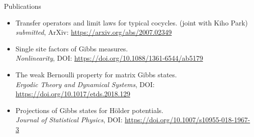 \documentclass{resume} %
\begin{document}
\begin{rSection}{Publications}
	\begin{itemize}
		\item 
		Transfer operators and limit laws for typical cocycles. (joint with Kiho Park)\\
		\emph{submitted}, ArXiv: \href{https://arxiv.org/abs/2007.02349}{\small{https://arxiv.org/abs/2007.02349}}
		
		\item 
		Single site factors of Gibbs measures.\\
		\emph{Nonlinearity}, DOI: \href{https://doi.org/10.1088/1361-6544/ab5179}{\small{https://doi.org/10.1088/1361-6544/ab5179}}
		
		\item 
		The weak Bernoulli property for matrix Gibbs states.\\
		\emph{Ergodic Theory and Dynamical Systems}, DOI: \href{https://doi.org/10.1017/etds.2018.129}{\small{https://doi.org/10.1017/etds.2018.129}}
		
		\item 
		Projections of Gibbs states for H\"older potentials.\\
		\emph{Journal of Statistical Physics}, DOI: \href{https://doi.org/10.1007/s10955-018-1967-3}{\small{https://doi.org/10.1007/s10955-018-1967-3}}
	\end{itemize}
\end{rSection}
\end{document}

